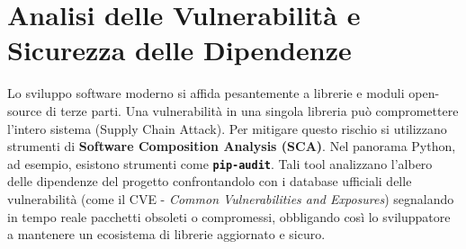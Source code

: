 \section{Analisi delle Vulnerabilità e Sicurezza delle Dipendenze}
Lo sviluppo software moderno si affida pesantemente a librerie e moduli open-source di terze parti. Una vulnerabilità in una singola libreria può compromettere l'intero sistema (Supply Chain Attack).
Per mitigare questo rischio si utilizzano strumenti di \textbf{Software Composition Analysis (SCA)}. Nel panorama Python, ad esempio, esistono strumenti come \textbf{\texttt{pip-audit}}. Tali tool analizzano l'albero delle dipendenze del progetto confrontandolo con i database ufficiali delle vulnerabilità (come il CVE - \textit{Common Vulnerabilities and Exposures}) segnalando in tempo reale pacchetti obsoleti o compromessi, obbligando così lo sviluppatore a mantenere un ecosistema di librerie aggiornato e sicuro.